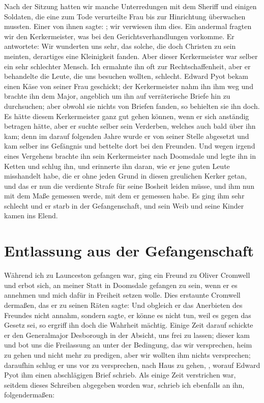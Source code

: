 Nach der Sitzung hatten wir manche Unterredungen mit dem
Sheriff und einigen Soldaten, die eine zum Tode verurteilte Frau
bis zur Hinrichtung überwachen mussten. Einer von ihnen sagte:
; wir
verwiesen ihm dies. Ein andermal fragten wir den Kerkermeister,
was bei den Gerichtsverhandlungen vorkomme. Er antwortete:
 Wir wunderten uns sehr, das solche, die doch
Christen zu sein meinten, derartiges eine Kleinigkeit fanden.
Aber dieser Kerkermeister war selber ein sehr schlechter Mensch.
Ich ermahnte ihn oft zur Rechtschaffenheit, aber er behandelte
die Leute, die uns besuchen wollten, schlecht. 
Edward Pyot bekam
einen Käse von seiner Frau geschickt; der Kerkermeister nahm ihn
ihm weg und brachte ihn dem Major, angeblich um ihn auf
verräterische Briefe hin zu durchsuchen; aber obwohl sie nichts
von Briefen fanden, so behielten sie ihn doch. Es hätte diesem
Kerkermeister ganz gut gehen können, wenn er sich anständig
betragen hätte, aber er suchte selber sein Verderben, welches auch
bald über ihn kam; denn im darauf folgenden Jahre wurde er
von seiner Stelle abgesetzt und kam selber ins Gefängnis und
bettelte dort bei den Freunden. Und wegen irgend eines 
Vergehens brachte ihn sein Kerkermeister nach Doomsdale und legte
ihn in Ketten und schlug ihn, und erinnerte ihn daran, wie er
jene guten Leute misshandelt habe, die er ohne jeden Grund in
diesen greulichen Kerker getan, und das er nun die verdiente
Strafe für seine Bosheit leiden müsse, und ihm nun mit dem
Maße gemessen werde, mit dem er gemessen habe. Es ging ihm
sehr schlecht und er starb in der Gefangenschaft, und sein Weib
und seine Kinder kamen ins Elend.

\section{Entlassung aus der Gefangenschaft}

Während ich zu Launceston gefangen war, ging ein Freund
zu Oliver Cromwell und erbot 
sich, an meiner Statt in 
Doomsdale gefangen zu sein, wenn er es annehmen und mich dafür
in Freiheit setzen wolle. Dies erstaunte Cromwell dermaßen,
das er zu seinen Räten sagte:  Und obgleich er
das Anerbieten des Freundes nicht annahm, sondern sagte, er
könne es nicht tun, weil es gegen das Gesetz sei, so ergriff ihn
doch die Wahrheit mächtig. Einige Zeit darauf schickte er den
Generalmajor Desborough 
in der Absicht, uns frei zu lassen;
dieser kam und bot uns die Freilassung an unter der Bedingung,
das wir versprechen, heim zu gehen und nicht mehr zu predigen,
aber wir wollten ihm nichts versprechen; daraufhin schlug er uns
vor zu versprechen, nach Haus zu gehen, , worauf Edward Pyot ihm 
einen abschlägigen Brief schrieb.
Als einige Zeit verstrichen war, seitdem dieses Schreiben
abgegeben worden war, schrieb ich ebenfalls an ihn, 
folgendermaßen:

